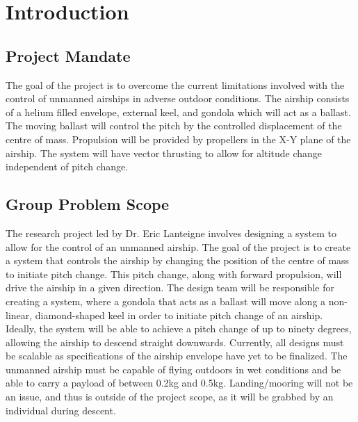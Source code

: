 \documentclass[../main.tex]{subfiles}
\begin{document}
\chapter{Introduction}
\section{Project Mandate} \label{Mandate}
The goal of the project is to overcome the current limitations involved with the control of unmanned airships in adverse outdoor conditions. The airship consists of a helium filled envelope, external keel, and gondola which will act as a ballast. The moving ballast will control the pitch by the controlled displacement of the centre of mass. Propulsion will be provided by propellers in the X-Y plane of the airship. The system will have vector thrusting to allow for altitude change independent of pitch change.

\section{Group Problem Scope} \label{Scope}
The research project led by Dr. Eric Lanteigne involves designing a system to allow for the control of an unmanned airship. The goal of the project is to create a system that controls the airship by changing the position of the centre of mass to initiate pitch change. This pitch change, along with forward propulsion, will drive the airship in a given direction. The design team will be responsible for creating a system, where a gondola that acts as a ballast will move along a non-linear, diamond-shaped keel in order to initiate pitch change of an airship. Ideally, the system will be able to achieve a pitch change of up to ninety degrees, allowing the airship to descend straight downwards. Currently, all designs must be scalable as specifications of the airship envelope have yet to be finalized. The unmanned airship must be capable of flying outdoors in wet conditions and be able to carry a payload of between 0.2kg and 0.5kg. Landing/mooring will not be an issue, and thus is outside of the project scope, as it will be grabbed by an individual during descent.

\end{document}

